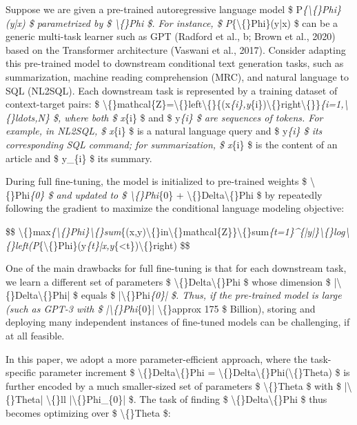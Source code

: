 \documentclass[conference]{IEEEtran}
\begin{document}
Suppose we are given a pre-trained autoregressive language model  \$ P\textit{\{\textbackslash\{\}Phi\}(y|x) \$ parametrized by  \$ \textbackslash\{\}Phi \$. For instance,  \$ P}\{\textbackslash\{\}Phi\}(y|x) \$ can be a generic multi-task learner such as GPT (Radford et al., b; Brown et al., 2020) based on the Transformer architecture (Vaswani et al., 2017). Consider adapting this pre-trained model to downstream conditional text generation tasks, such as summarization, machine reading comprehension (MRC), and natural language to SQL (NL2SQL). Each downstream task is represented by a training dataset of context-target pairs:  \$ \textbackslash\{\}mathcal\{Z\}=\textbackslash\{\}left\textbackslash\{\}\{(x\textit{\{i\},y}\{i\})\textbackslash\{\}right\textbackslash\{\}\}\textit{\{i=1,\textbackslash\{\}ldots,N\} \$, where both  \$ x}\{i\} \$ and  \$ y\textit{\{i\} \$ are sequences of tokens. For example, in NL2SQL,  \$ x}\{i\} \$ is a natural language query and  \$ y\textit{\{i\} \$ its corresponding SQL command; for summarization,  \$ x}\{i\} \$ is the content of an article and  \$ y\_\{i\} \$ its summary.

During full fine-tuning, the model is initialized to pre-trained weights  \$ \textbackslash\{\}Phi\textit{\{0\} \$ and updated to  \$ \textbackslash\{\}Phi}\{0\} + \textbackslash\{\}Delta\textbackslash\{\}Phi \$ by repeatedly following the gradient to maximize the conditional language modeling objective:

\$\$ \textbackslash\{\}max\textit{\{\textbackslash\{\}Phi\}\textbackslash\{\}sum}\{(x,y)\textbackslash\{\}in\textbackslash\{\}mathcal\{Z\}\}\textbackslash\{\}sum\textit{\{t=1\}\textasciicircum{}\{|y|\}\textbackslash\{\}log\textbackslash\{\}left(P}\{\textbackslash\{\}Phi\}(y\textit{\{t\}|x,y}\{\textless{}t\})\textbackslash\{\}right) \$\$

One of the main drawbacks for full fine-tuning is that for each downstream task, we learn a different set of parameters  \$ \textbackslash\{\}Delta\textbackslash\{\}Phi \$ whose dimension  \$ |\textbackslash\{\}Delta\textbackslash\{\}Phi| \$ equals  \$ |\textbackslash\{\}Phi\textit{\{0\}| \$. Thus, if the pre-trained model is large (such as GPT-3 with  \$ |\textbackslash\{\}Phi}\{0\}| \textbackslash\{\}approx 175 \$ Billion), storing and deploying many independent instances of fine-tuned models can be challenging, if at all feasible.

In this paper, we adopt a more parameter-efficient approach, where the task-specific parameter increment  \$ \textbackslash\{\}Delta\textbackslash\{\}Phi = \textbackslash\{\}Delta\textbackslash\{\}Phi(\textbackslash\{\}Theta) \$ is further encoded by a much smaller-sized set of parameters  \$ \textbackslash\{\}Theta \$ with  \$ |\textbackslash\{\}Theta| \textbackslash\{\}ll |\textbackslash\{\}Phi\_\{0\}| \$. The task of finding  \$ \textbackslash\{\}Delta\textbackslash\{\}Phi \$ thus becomes optimizing over  \$ \textbackslash\{\}Theta \$:
\end{document}
